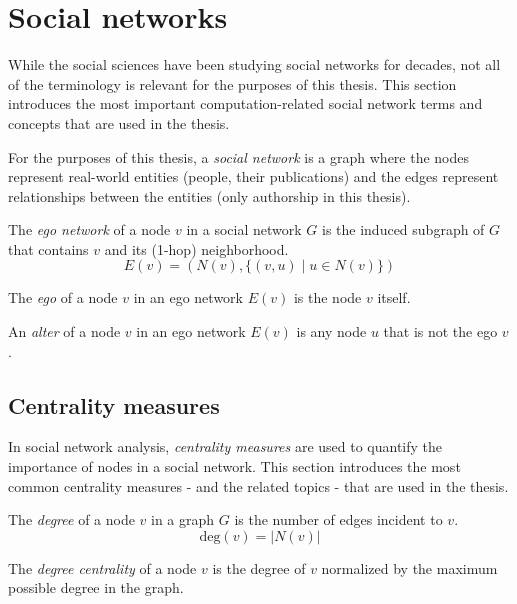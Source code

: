 \section{Social networks}

While the social sciences have been studying social networks for decades, not all of the terminology is relevant for the purposes of this thesis.
This section introduces the most important computation-related social network terms and concepts that are used in the thesis.

For the purposes of this thesis, a \textit{social network} is a graph where the nodes represent real-world entities (people, their publications) and the edges represent relationships between the entities (only authorship in this thesis).

\begin{definition}
    The \textit{ego network} of a node $v$ in a social network $G$ is the induced subgraph of $G$ that contains $v$ and its (1-hop) neighborhood.
    $$
    E(v) = (N(v), \{ (v, u) \mid u \in N(v) \})
    $$
\end{definition}

\begin{definition}
    The \textit{ego} of a node $v$ in an ego network $E(v)$ is the node $v$ itself.
\end{definition}

\begin{definition}
    An \textit{alter} of a node $v$ in an ego network $E(v)$ is any node $u$ that is not the ego $v$.
\end{definition}

\subsection{Centrality measures}

In social network analysis, \textit{centrality measures} are used to quantify the importance of nodes in a social network.
This section introduces the most common centrality measures - and the related topics - that are used in the thesis.

\begin{definition}
    The \textit{degree} of a node $v$ in a graph $G$ is the number of edges incident to $v$.
    $$
    \text{deg}(v) = |N(v)|
    $$

    The \textit{degree centrality} of a node $v$ is the degree of $v$ normalized by the maximum possible degree in the graph.
\end{definition}

